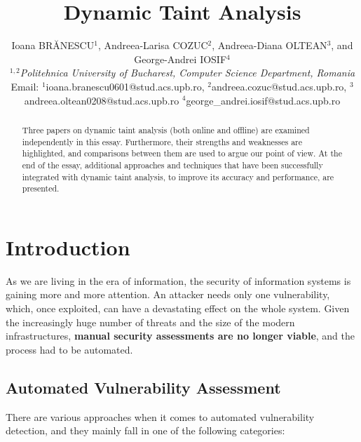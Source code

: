 \documentclass[10pt,a4paper,english,onecolumn]{IEEEtran}
\begin{document}
\title{Dynamic Taint Analysis}

\author{Ioana BRĂNESCU$^{1}$, Andreea-Larisa COZUC$^{2}$, Andreea-Diana OLTEAN$^{3}$, and George-Andrei IOSIF$^{4}$\\
$^{1,2}$\emph{Politehnica University of Bucharest, Computer Science Department, Romania}\\
Email: $^{1}$ioana.branescu0601@stud.acs.upb.ro, $^{2}$andreea.cozuc@stud.acs.upb.ro, $^{3}$andreea.oltean0208@stud.acs.upb.ro $^{4}$george\_andrei.iosif@stud.acs.upb.ro}

\maketitle

\begin{abstract}

Three papers on dynamic taint analysis (both online and offline) are examined independently in this essay. Furthermore, their strengths and weaknesses are highlighted, and comparisons between them are used to argue our point of view. At the end of the essay, additional approaches and techniques that have been successfully integrated with dynamic taint analysis, to improve its accuracy and performance, are presented. 

\end{abstract}

\section{Introduction}

As we are living in the era of information, the security of information systems is gaining more and more attention. An attacker needs only one vulnerability, which, once exploited, can have a devastating effect on the whole system. Given the increasingly huge number of threats and the size of the modern infrastructures, \textbf{manual security assessments are no longer viable}, and the process had to be automated.

\subsection{Automated Vulnerability Assessment}

There are various approaches when it comes to automated vulnerability detection, and they mainly fall in one of the following categories:
\end{document}
